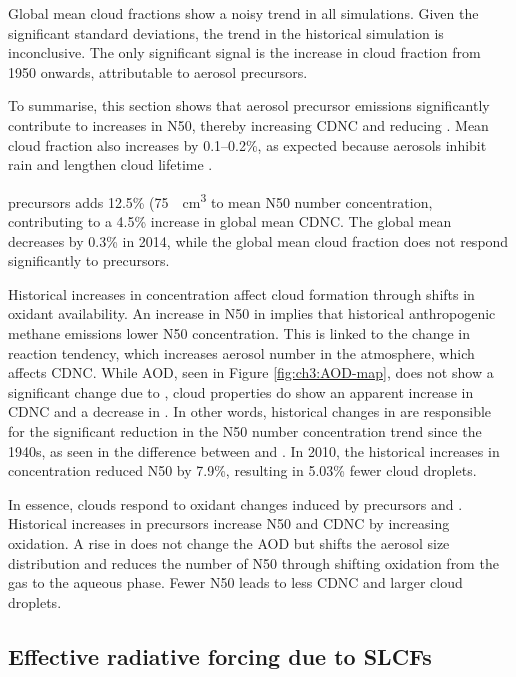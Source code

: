 Global mean cloud fractions show a noisy trend in all simulations. Given the significant standard deviations, the trend in the historical simulation is inconclusive. The only significant signal is the increase in cloud fraction from 1950 onwards, attributable to aerosol precursors.


To summarise, this section shows that aerosol precursor emissions significantly contribute to increases in N50, thereby increasing CDNC and reducing \Reff{}. Mean cloud fraction also increases by 0.1--0.2\%, as expected because aerosols inhibit rain and lengthen cloud lifetime \citep{albrechtAerosolsCloudMicrophysics1989}.


 precursors adds 12.5\% (\qty{75}{\per\centi\metre\cubed} to mean N50 number concentration, contributing to a 4.5\% increase in global mean CDNC. The global mean \Reff{} decreases by 0.3\% in 2014, while the global mean cloud fraction does not respond significantly to  precursors. 

Historical increases in  concentration affect cloud formation through shifts in oxidant availability. An increase in N50 in \sstpich{} implies that historical anthropogenic methane emissions lower N50 concentration. This is linked to the change in  reaction tendency, which increases aerosol number in the atmosphere, which affects CDNC. While AOD, seen in Figure \ref{fig:ch3:AOD-map}, does not show a significant change due to , cloud properties do show an apparent increase in CDNC and a decrease in \Reff{}. In other words, historical changes in  are responsible for the significant reduction in the N50 number concentration trend since the 1940s, as seen in the difference between \histsst{} and \sstpich{}. In 2010, the historical increases in  concentration reduced N50 by 7.9\%, resulting in 5.03\% fewer cloud droplets. 

In essence, clouds respond to oxidant changes induced by  precursors and . Historical increases in  precursors increase N50 and CDNC by increasing  oxidation. A rise in  does not change the AOD but shifts the aerosol size distribution and reduces the number of N50 through shifting oxidation from the gas to the aqueous phase. Fewer N50 leads to less CDNC and larger cloud droplets.


\subsection{Effective radiative forcing due to SLCFs}

